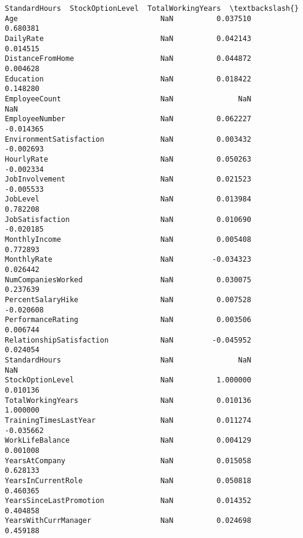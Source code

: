 \documentclass[11pt]{article}
\begin{document}
\begin{Verbatim}[commandchars=\\\{\}]
                          StandardHours  StockOptionLevel  TotalWorkingYears  \textbackslash{}
Age                                 NaN          0.037510           0.680381   
DailyRate                           NaN          0.042143           0.014515   
DistanceFromHome                    NaN          0.044872           0.004628   
Education                           NaN          0.018422           0.148280   
EmployeeCount                       NaN               NaN                NaN   
EmployeeNumber                      NaN          0.062227          -0.014365   
EnvironmentSatisfaction             NaN          0.003432          -0.002693   
HourlyRate                          NaN          0.050263          -0.002334   
JobInvolvement                      NaN          0.021523          -0.005533   
JobLevel                            NaN          0.013984           0.782208   
JobSatisfaction                     NaN          0.010690          -0.020185   
MonthlyIncome                       NaN          0.005408           0.772893   
MonthlyRate                         NaN         -0.034323           0.026442   
NumCompaniesWorked                  NaN          0.030075           0.237639   
PercentSalaryHike                   NaN          0.007528          -0.020608   
PerformanceRating                   NaN          0.003506           0.006744   
RelationshipSatisfaction            NaN         -0.045952           0.024054   
StandardHours                       NaN               NaN                NaN   
StockOptionLevel                    NaN          1.000000           0.010136   
TotalWorkingYears                   NaN          0.010136           1.000000   
TrainingTimesLastYear               NaN          0.011274          -0.035662   
WorkLifeBalance                     NaN          0.004129           0.001008   
YearsAtCompany                      NaN          0.015058           0.628133   
YearsInCurrentRole                  NaN          0.050818           0.460365   
YearsSinceLastPromotion             NaN          0.014352           0.404858   
YearsWithCurrManager                NaN          0.024698           0.459188   


\end{Verbatim}
\end{document}
